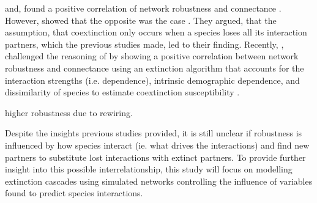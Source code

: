 \documentclass[12pt,a4paper]{article}
\begin{document}
\citeauthor{Dunne2002, Ekloef2006} and, \citeauthor{Thebault2010} found a positive correlation of network robustness and connectance \parencite{Dunne2002, Ekloef2006, Thebault2010}. However, \citeauthor{Vieira2015} showed that the opposite was the case \parencite{Vieira2015}. They argued, that the assumption, that coextinction only occurs when a species loses all its interaction partners, which the previous studies made, led to their finding. Recently, \citeauthor{Baumgartner2020}, challenged the reasoning of \citeauthor{Vieira2015} by showing a positive correlation between network robustness and connectance using an extinction algorithm that accounts for the interaction strengths (i.e. dependence), intrinsic demographic dependence, and dissimilarity of species to estimate coextinction susceptibility \parencite{Baumgartner2020}. 


\parencite{Kaiser-Bunbury2010, Schleuning2016, Timoteo2016, Costa2018} higher robustness due to rewiring. %



Despite the insights previous studies provided, it is still unclear if robustness is influenced by how species interact (ie. what drives the interactions) and find new partners to substitute lost interactions with extinct partners. To provide further insight into this possible interrelationship, this study will focus on modelling extinction cascades using simulated networks controlling the influence of variables found to predict species interactions.\\

\end{document}
